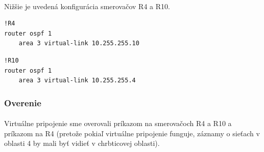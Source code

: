 \documentclass[12pt,twoside,a4paper]{report}
\begin{document}
\paragraph{}
Nižšie je uvedená konfigurácia smerovačov R4 a R10.

\noindent
{\selectfont
\begin{small}
\begin{verbatim}
!R4
router ospf 1
    area 3 virtual-link 10.255.255.10

\end{verbatim}
\end{small}
}

\noindent
{\selectfont
\begin{small}
\begin{verbatim}
!R10
router ospf 1
    area 3 virtual-link 10.255.255.4

\end{verbatim}
\end{small}
}

\subsubsection{Overenie}
\paragraph{}
Virtuálne pripojenie sme overovali príkazom  na smerovačoch R4 a R10 a príkazom  na R4 (pretože pokiaľ virtuálne pripojenie funguje, záznamy o sieťach v oblasti 4 by mali byť vidieť v chrbticovej oblasti).
\end{document}
